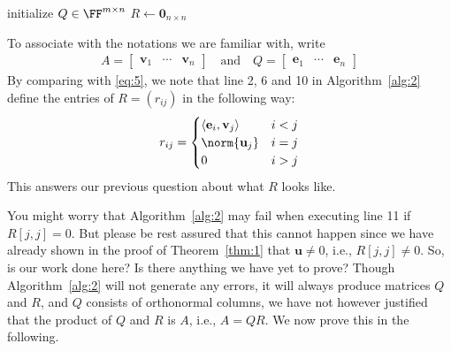 \documentclass[thmcnt=section, color=blue, 12pt]{my-elegantbook}
\begin{document}
\begin{algorithm}
    \caption{Classical Gram-Schmidt QR Decomposition}
    \label{alg:2}
    initialize $Q \in \FF^{m \times n}$ \;
    $R \gets \mathbf{0}_{n \times n}$ \;
\end{algorithm}

To associate with the notations we are familiar with, write
\begin{align*}
    A = \begin{bmatrix}
        \mathbf{v}_1 & \cdots & \mathbf{v}_n
    \end{bmatrix}
    \quad \text{and} \quad 
    Q = \begin{bmatrix}
        \mathbf{e}_1 & \cdots & \mathbf{e}_n
    \end{bmatrix}
\end{align*}
By comparing with \eqref{eq:5}, we note that line 2, 6 and 10 in Algorithm~\ref{alg:2} define the entries of $R = (r_{ij})$ in the following way:
\begin{align*}
    r_{ij} = \begin{cases}
        \left\langle \mathbf{e}_i, \mathbf{v}_j \right\rangle
        &i < j \\ 
        \norm{\mathbf{u}_j}
        &i=j \\ 
        0
        &i > j
    \end{cases}
\end{align*}
This answers our previous question about what $R$ looks like. 

You might worry that Algorithm~\ref{alg:2} may fail when executing line 11 if $R[j,j] = 0$. But please be rest assured that this cannot happen since we have already shown in the proof of Theorem~\ref{thm:1} that $\mathbf{u} \neq 0$, i.e., $R[j,j] \neq 0$. So, is our work done here? Is there anything we have yet to prove? Though Algorithm~\ref{alg:2} will not generate any errors, it will always produce matrices $Q$ and $R$, and $Q$ consists of orthonormal columns, we have not however justified that the product of $Q$ and $R$ is $A$, i.e., $A = QR$. We now prove this in the following.
\end{document}
